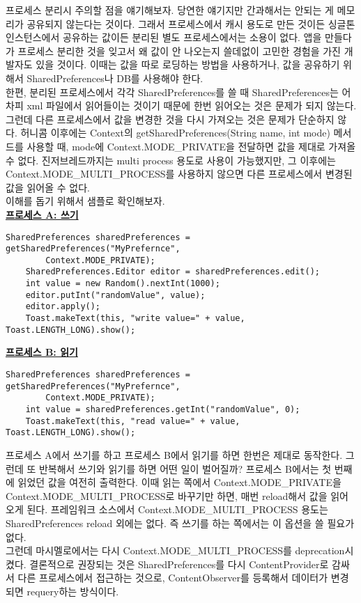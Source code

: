 프로세스 분리시 주의할 점을 얘기해보자.
당연한 얘기지만 간과해서는 안되는 게 메모리가 공유되지 않는다는 것이다. 
그래서 프로세스에서 캐시 용도로 만든 것이든 싱글톤 인스턴스에서 공유하는 값이든 분리된 별도 프로세스에서는 소용이 없다.
앱을 만들다가 프로세스 분리한 것을 잊고서 왜 값이 안 나오는지 쓸데없이 고민한 경험을 가진 개발자도 있을 것이다.
이때는 값을 따로 로딩하는 방법을 사용하거나, 값을 공유하기 위해서 SharedPreferences나 DB를 사용해야 한다.\\

한편, 분리된 프로세스에서 각각 SharedPreferences를 쓸 때  
SharedPreferences는 어차피 xml 파일에서 읽어들이는 것이기 때문에 한번 읽어오는 것은 문제가 되지 않는다.
그런데 다른 프로세스에서 값을 변경한 것을 다시 가져오는 것은 문제가 단순하지 않다.
허니콤 이후에는 Context의 getSharedPreferences(String name, int mode) 메서드를 사용할 때, mode에
Context.MODE\_PRIVATE을 전달하면 값을 제대로 가져올 수 없다.
진저브레드까지는 multi process 용도로 사용이 가능했지만, 그 이후에는 Context.MODE\_MULTI\_PROCESS를 사용하지 않으면 다른 프로세스에서 변경된 값을 읽어올 수 없다.\\

이해를 돕기 위해서 샘플로 확인해보자.\\
\underline{\bfseries 프로세스 A: 쓰기}
\begin{lstlisting}[frame=single] 
    SharedPreferences sharedPreferences = getSharedPreferences("MyPrefernce", 
    	Context.MODE_PRIVATE);
    SharedPreferences.Editor editor = sharedPreferences.edit();
    int value = new Random().nextInt(1000);
    editor.putInt("randomValue", value);
    editor.apply();
    Toast.makeText(this, "write value=" + value, Toast.LENGTH_LONG).show();
\end{lstlisting}

\underline{\bfseries 프로세스 B: 읽기}
\begin{lstlisting}[frame=single] 
	SharedPreferences sharedPreferences = getSharedPreferences("MyPrefernce", 
		Context.MODE_PRIVATE);
    int value = sharedPreferences.getInt("randomValue", 0);
    Toast.makeText(this, "read value=" + value, Toast.LENGTH_LONG).show();
\end{lstlisting}

프로세스 A에서 쓰기를 하고 프로세스 B에서 읽기를 하면 한번은 제대로 동작한다.
그런데 또 반복해서 쓰기와 읽기를 하면 어떤 일이 벌어질까?
프로세스 B에서는 첫 번째에 읽었던 값을 여전히 출력한다.
이때 읽는 쪽에서 Context.MODE\_PRIVATE을 Context.MODE\_MULTI\_PROCESS로 바꾸기만 하면, 매번 reload해서 값을 읽어오게 된다.
프레임워크 소스에서 Context.MODE\_MULTI\_\-PROCESS 용도는 SharedPreferences reload 외에는 없다. 
즉 쓰기를 하는 쪽에서는 이 옵션을 쓸 필요가 없다.\\

그런데 마시멜로에서는 다시 Context.MODE\_MULTI\_\-PROCESS를 deprecation시켰다. 
결론적으로 권장되는 것은 SharedPreferences를 다시 ContentProvider로 감싸서 다른 프로세스에서 접근하는 것으로,
ContentObserver를 등록해서 데이터가 변경되면 requery하는 방식이다.


